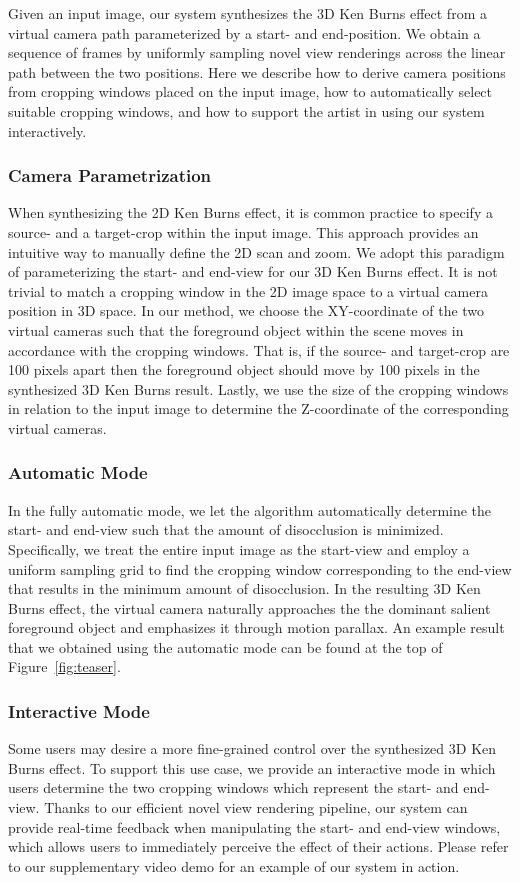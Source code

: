 \documentclass[acmtog,authorversion]{acmart}
\begin{document}
Given an input image, our system synthesizes the 3D Ken Burns effect from a virtual camera path parameterized by a start- and end-position. We obtain a sequence of frames by uniformly sampling novel view renderings across the linear path between the two positions. Here we describe how to derive camera positions from cropping windows placed on the input image, how to automatically select suitable cropping windows, and how to support the artist in using our system interactively.

\subsubsection{Camera Parametrization} When synthesizing the 2D Ken Burns effect, it is common practice to specify a source- and a target-crop within the input image. This approach provides an intuitive way to manually define the 2D scan and zoom. We adopt this paradigm of parameterizing the start- and end-view for our 3D Ken Burns effect. It is not trivial to match a cropping window in the 2D image space to a virtual camera position in 3D space. In our method, we choose the XY-coordinate of the two virtual cameras such that the foreground object within the scene moves in accordance with the cropping windows. That is, if the source- and target-crop are 100 pixels apart then the foreground object should move by 100 pixels in the synthesized 3D Ken Burns result. Lastly, we use the size of the cropping windows in relation to the input image to determine the Z-coordinate of the corresponding virtual cameras.

\subsubsection{Automatic Mode}
\label{sec:automode}
In the fully automatic mode, we let the algorithm automatically determine the start- and end-view such that the amount of disocclusion is minimized. Specifically, we treat the entire input image as the start-view and employ a uniform sampling grid to find the cropping window corresponding to the end-view that results in the minimum amount of disocclusion. In the resulting 3D Ken Burns effect, the virtual camera naturally approaches the the dominant salient foreground object and emphasizes it through motion parallax. An example result that we obtained using the automatic mode can be found at the top of Figure~\ref{fig:teaser}.

\subsubsection{Interactive Mode} Some users may desire a more fine-grained control over the synthesized 3D Ken Burns effect. To support this use case, we provide an interactive mode in which users determine the two cropping windows which represent the start- and end-view. Thanks to our efficient novel view rendering pipeline, our system can provide real-time feedback when manipulating the start- and end-view windows, which allows users to immediately perceive the effect of their actions. Please refer to our supplementary video demo for an example of our system in action.
\end{document}
